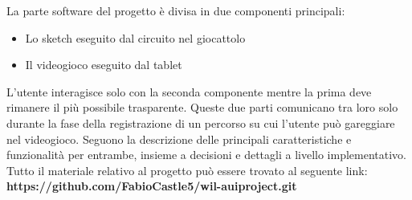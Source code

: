 \documentclass[documentation.tex]{subfiles}
\begin{document}
	La parte software del progetto è divisa in due componenti principali:
	\begin{itemize}
		\item Lo sketch eseguito dal circuito nel giocattolo
		\item Il videogioco eseguito dal tablet
	\end{itemize}
	L'utente interagisce solo con la seconda componente mentre la prima deve rimanere il più possibile trasparente. Queste due parti comunicano tra loro solo durante la fase della registrazione di un percorso su cui l'utente può gareggiare nel videogioco. Seguono la descrizione delle principali caratteristiche e funzionalità per entrambe, insieme a decisioni e dettagli a livello implementativo.
	Tutto il materiale relativo al progetto può essere trovato al seguente link: \textbf{https://github.com/FabioCastle5/wil-auiproject.git}
\end{document}
